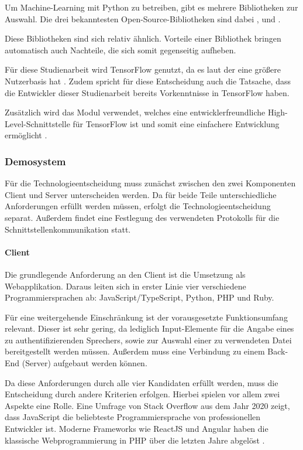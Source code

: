 Um Machine-Learning mit Python zu betreiben, gibt es mehrere Bibliotheken zur Auswahl.
Die drei bekanntesten Open-Source-Bibliotheken sind dabei ,  und  \autocite[vgl.][]{msv_tensorflow_2020}.

Diese Bibliotheken sind sich relativ ähnlich.
Vorteile einer Bibliothek bringen automatisch auch Nachteile, die sich somit gegenseitig aufheben.

Für diese Studienarbeit wird TensorFlow genutzt, da es laut der  eine größere Nutzerbasis hat \autocite[vgl.][]{stack_overflow_stack_2022}.
Zudem spricht für diese Entscheidung auch die Tatsache, dass die Entwickler dieser Studienarbeit bereits Vorkenntnisse in TensorFlow haben.

Zusätzlich wird das Modul  verwendet, welches eine entwicklerfreundliche High-Level-Schnittstelle für TensorFlow ist und somit eine einfachere Entwicklung ermöglicht \autocite[vgl.][]{noauthor_keras_2023}.

\subsubsection{Demosystem}

\textauthor{\vHS}{}{}

Für die Technologieentscheidung muss zunächst zwischen den zwei Komponenten Client und Server unterscheiden werden.
Da für beide Teile unterschiedliche Anforderungen erfüllt werden müssen, erfolgt die Technologieentscheidung separat.
Außerdem findet eine Festlegung des verwendeten Protokolls für die Schnittstellenkommunikation statt.

\paragraph{Client}
Die grundlegende Anforderung an den Client ist die Umsetzung als Webapplikation.
Daraus leiten sich in erster Linie vier verschiedene Programmiersprachen ab: JavaScript/Type\-Script, Python, PHP und Ruby.

Für eine weitergehende Einschränkung ist der vorausgesetzte Funktionsumfang relevant.
Dieser ist sehr gering, da lediglich Input-Elemente für die Angabe eines zu authentifizierenden Sprechers, sowie zur Auswahl einer zu verwendeten Datei bereitgestellt werden müssen.
Außerdem muss eine Verbindung zu einem Back-End (Server) aufgebaut werden können.

Da diese Anforderungen durch alle vier Kandidaten erfüllt werden, muss die Entscheidung durch andere Kriterien erfolgen.
Hierbei spielen vor allem zwei Aspekte eine Rolle.
Eine Umfrage von Stack Overflow aus dem Jahr 2020 zeigt, dass JavaScript die beliebteste Programmiersprache von professionellen Entwickler ist.
Moderne Frameworks wie ReactJS und Angular haben die klassische Webprogrammierung in PHP über die letzten Jahre abgelöst \autocite[vgl.][]{stack_overflow_stack_2020}.

